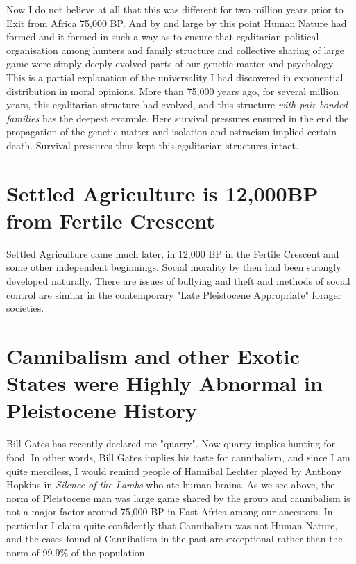 \documentclass{amsart}
\begin{document}
Now I do not believe at all that this was different for two million years prior to Exit from Africa 75,000 BP.  And by and large by this point Human Nature had formed and it formed in such a way as to ensure that egalitarian political organisation among hunters and family structure and collective sharing of large game were simply deeply evolved parts of our genetic matter and psychology.  This is a partial explanation of the universality I had discovered in exponential distribution in moral opinions.  More than 75,000 years ago, for several million years, this egalitarian structure had evolved, and this structure {\em with pair-bonded families} has the deepest example.  Here survival pressures ensured in the end the propagation of the genetic matter and isolation and ostracism implied certain death.  Survival pressures thus kept this egalitarian structures intact.  

\section{Settled Agriculture is 12,000BP from Fertile Crescent}

Settled Agriculture came much later, in 12,000 BP in the Fertile Crescent and some other independent beginnings.  Social morality by then had been strongly developed naturally.  There are issues of bullying and theft and methods of social control are similar in the contemporary "Late Pleistocene Appropriate" forager societies.  

\section{Cannibalism and other Exotic States were Highly Abnormal in Pleistocene History}

Bill Gates has recently declared me "quarry".  Now quarry implies hunting for food.  In other words, Bill Gates implies his taste for cannibalism, and since I am quite merciless, I would remind people of Hannibal Lechter played by Anthony Hopkins in {\em Silence of the Lambs} who ate human brains.  As we see above, the norm of Pleistocene man was large game shared by the group and cannibalism is not a major factor around 75,000 BP in East Africa among our ancestors.  In particular I claim quite confidently that Cannibalism was not Human Nature, and the cases found of Cannibalism in the past are exceptional rather than the norm of 99.9\% of the population.

\section{}
\end{document}
